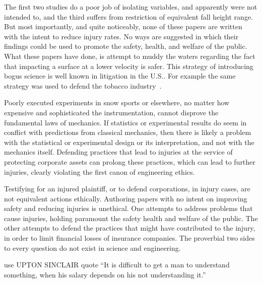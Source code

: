 \documentclass[smallextended]{svjour3}       %
\begin{document}
The first two studies do a poor job of isolating variables, and apparently were
not intended to, and the third suffers from restriction of equivalent fall
height range. But most importantly, and quite noticeably, none of these papers
are written with the intent to reduce injury rates. No ways are suggested in
which their findings could be used to promote the safety, health, and welfare
of the public. What these papers have done, is attempt to muddy the waters
regarding the fact that impacting a surface at a lower velocity is safer. This
strategy of introducing bogus science is well known in litigation in the U.S..
For example the same strategy was used to defend the tobacco
industry~\cite{Oreskes2010}.

Poorly executed experiments in snow sports or elsewhere, no matter how
expensive and sophisticated the instrumentation, cannot disprove the
fundamental laws of mechanics. If statistics or experimental results do seem in
conflict with predictions from classical mechanics, then there is likely a
problem with the statistical or experimental design or its interpretation, and
not with the mechanics itself. Defending practices that lead to injuries at the
service of protecting corporate assets can prolong these practices, which can
lead to further injuries, clearly violating the first canon of engineering
ethics.

Testifying for an injured plaintiff, or to defend corporations, in injury
cases, are not equivalent actions ethically. Authoring papers with no intent on
improving safety and reducing injuries is unethical. One attempts to address
problems that cause injuries, holding paramount the safety health and welfare
of the public. The other attempts to defend the practices that might have
contributed to the injury, in order to limit financial losses of insurance
companies. The proverbial two sides to every question do not exist in science
and engineering.


use UPTON SINCLAIR quote \cite{Sinclair1994}
 “It is difficult to get a man to understand something, when his salary depends on his not understanding it.” 
\end{document}

